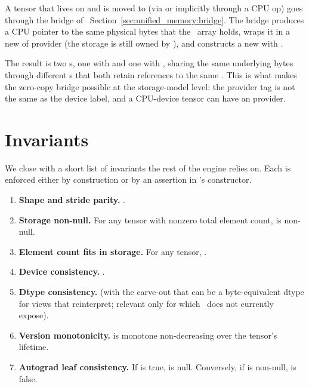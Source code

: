 A tensor that lives on  and is moved to 
(via  or implicitly through a CPU op) goes through
the  bridge of
~Section~\ref{sec:unified_memory:bridge}.
The bridge produces a CPU pointer to the same physical bytes that
the \MLX\ array holds, wraps it in a new  of provider
 (the storage is still owned by \MLX), and constructs a
new  with .

The result is two s, one with 
and one with , sharing the same underlying
bytes through different s that both retain references
to the same . This is what makes the
zero-copy bridge possible at the storage-model level: the
provider tag is not the same as the device label, and a CPU-device
tensor can have an  provider.

\section{Invariants}
\label{sec:tensor_model:invariants}

We close with a short list of invariants the rest of the engine
relies on. Each is enforced either by construction or by an
assertion in 's constructor.

\begin{enumerate}
  \item \textbf{Shape and stride parity.} .
  \item \textbf{Storage non-null.} For any tensor with nonzero
    total element count,  is non-null.
  \item \textbf{Element count fits in storage.} For any tensor,
    .
  \item \textbf{Device consistency.} .
  \item \textbf{Dtype consistency.}  (with the carve-out that 
    can be a byte-equivalent dtype for views that reinterpret;
    relevant only for  which \Lucid\
    does not currently expose).
  \item \textbf{Version monotonicity.}  is
    monotone non-decreasing over the tensor's lifetime.
  \item \textbf{Autograd leaf consistency.} If  is
    true,  is null. Conversely, if \code{grad\_fn}
    is non-null, \code{is\_leaf} is false.
\end{enumerate}

